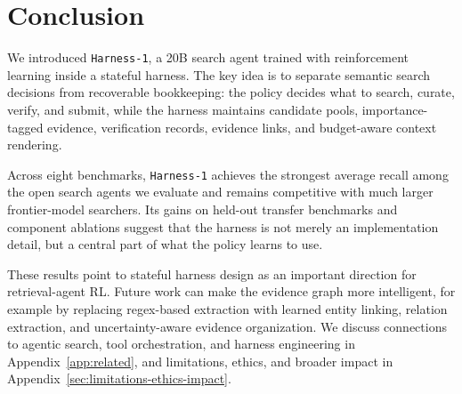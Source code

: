 \documentclass{article}
\newcommand{\sys}{\texttt{Harness-1}\xspace}
\newcommand{\verify}{\texttt{verify}\xspace}
\begin{document}

\section{Conclusion}
\label{sec:conclusion}

We introduced \sys, a 20B search agent trained with reinforcement learning
inside a stateful harness. The key idea is to separate semantic search decisions
from recoverable bookkeeping: the policy decides what to search, curate, verify,
and submit, while the harness maintains candidate pools, importance-tagged
evidence, verification records, evidence links, and budget-aware context
rendering.

Across eight benchmarks, \sys achieves the strongest average recall among the
open search agents we evaluate and remains competitive with much larger
frontier-model searchers. Its gains on held-out transfer benchmarks and
component ablations suggest that the harness is not merely an implementation
detail, but a central part of what the policy learns to use.

These results point to stateful harness design as an important direction for
retrieval-agent RL. Future work can make the evidence graph more intelligent,
for example by replacing regex-based extraction with learned entity linking,
relation extraction, and uncertainty-aware evidence organization. We discuss
connections to agentic search, tool orchestration, and harness
engineering in Appendix~\ref{app:related}, and limitations, ethics, and broader
impact in Appendix~\ref{sec:limitations-ethics-impact}.


\end{document}
